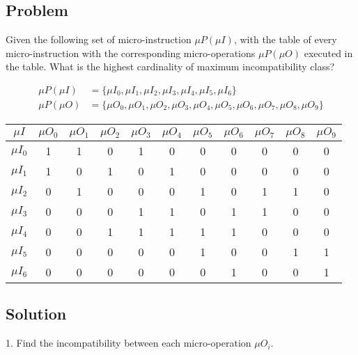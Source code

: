 \subsection*{Problem}

Given the following set of micro-instruction $\mu P(\mu I)$, with the table of every micro-instruction with the corresponding micro-operations $\mu P(\mu O)$ executed in the table.
What is the highest cardinality of maximum incompatibility class?

\begin{align*}
\mu P(\mu I) & = \{ \mu I_{0}, \mu I_{1}, \mu I_{2}, \mu I_{3}, \mu I_{4}, \mu I_{5}, \mu I_{6}\} \\
\mu P(\mu O) & = \{ \mu O_{0}, \mu O_{1}, \mu O_{2}, \mu O_{3}, \mu O_{4}, \mu O_{5}, \mu O_{6}, \mu O_{7}, \mu O_{8}, \mu O_{9}\}
\end{align*}

\begin{table}[H]
    \centering
    \begin{tabular}{|c|c|c|c|c|c|c|c|c|c|c|}
        \hline
        $\mu I$ & $\mu O_{0}$ & $\mu O_{1}$ & $\mu O_{2}$ & $\mu O_{3}$ & $\mu O_{4}$ & $\mu O_{5}$ & $\mu O_{6}$ & $\mu O_{7}$ & $\mu O_{8}$ & $\mu O_{9}$ \\
        \hline
        \hline
        $\mu I_{0}$ & 1 & 1 & 0 & 1 & 0 & 0 & 0 & 0 & 0 & 0 \\ \hline
        $\mu I_{1}$ & 1 & 0 & 1 & 0 & 1 & 0 & 0 & 0 & 0 & 0 \\ \hline
        $\mu I_{2}$ & 0 & 1 & 0 & 0 & 0 & 1 & 0 & 1 & 1 & 0 \\ \hline
        $\mu I_{3}$ & 0 & 0 & 0 & 1 & 1 & 0 & 1 & 1 & 0 & 0 \\ \hline
        $\mu I_{4}$ & 0 & 0 & 1 & 1 & 1 & 1 & 1 & 0 & 0 & 0 \\ \hline
        $\mu I_{5}$ & 0 & 0 & 0 & 0 & 0 & 1 & 0 & 0 & 1 & 1 \\ \hline
        $\mu I_{6}$ & 0 & 0 & 0 & 0 & 0 & 0 & 1 & 0 & 0 & 1 \\ \hline
    \end{tabular}
\end{table}

\subsection*{Solution}

1. Find the incompatibility between each micro-operation $\mu O_{i}$.


